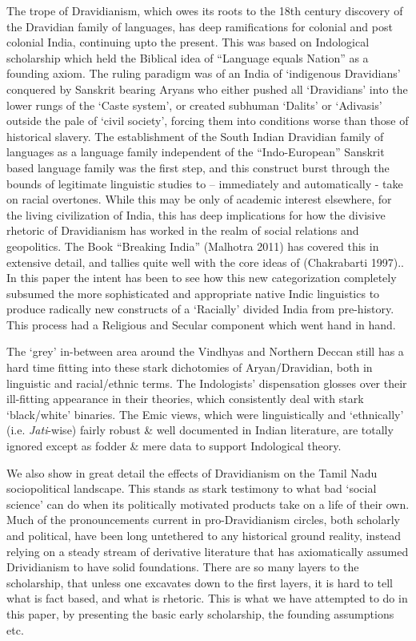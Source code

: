 The trope of Dravidianism, which owes its roots to the 18th century discovery of the Dravidian family of languages, has deep ramifications for colonial and post colonial India, continuing upto the present. This was based on Indological scholarship which held the Biblical idea of “Language equals Nation” as a founding axiom. The ruling paradigm was of an India of ‘indigenous Dravidians’ conquered by Sanskrit bearing Aryans who either pushed all ‘Dravidians’ into the lower rungs of the ‘Caste system’, or created subhuman ‘Dalits’ or ‘Adivasis’ outside the pale of ‘civil society’, forcing them into conditions worse than those of historical slavery. The establishment of the South Indian Dravidian family of languages as a language family independent of the “Indo-European” Sanskrit based language family was the first step, and this construct burst through the bounds of legitimate linguistic studies to – immediately and automatically - take on racial overtones. While this may be only of academic interest elsewhere, for the living civilization of India, this has deep implications for how the divisive rhetoric of Dravidianism has worked in the realm of social relations and geopolitics. The Book “Breaking India” (Malhotra 2011) has covered this in extensive detail, and tallies quite well with the core ideas of (Chakrabarti 1997).. In this paper the intent has been to see how this new categorization completely subsumed the more sophisticated and appropriate native Indic linguistics to produce radically new constructs of a ‘Racially’ divided India from pre-history. This process had a Religious and Secular component which went hand in hand.

The ‘grey’ in-between area around the Vindhyas and Northern Deccan still has a hard time fitting into these stark dichotomies of Aryan/Dravidian, both in linguistic and racial/ethnic terms. The Indologists’ dispensation glosses over their ill-fitting appearance in their theories, which consistently deal with stark ‘black/white’ binaries. The Emic views, which were linguistically and ‘ethnically’ (i.e. \textit{Jati}-wise) fairly robust \& well documented in Indian literature, are totally ignored except as fodder \& mere data to support Indological theory.

We also show in great detail the effects of Dravidianism on the Tamil Nadu sociopolitical landscape. This stands as stark testimony to what bad ‘social science’ can do when its politically motivated products take on a life of their own. Much of the pronouncements current in pro-Dravidianism circles, both scholarly and political, have been long untethered to any historical ground reality, instead relying on a steady stream of derivative literature that has axiomatically assumed Drividianism to have solid foundations. There are so many layers to the scholarship, that unless one excavates down to the first layers, it is hard to tell what is fact based, and what is rhetoric. This is what we have attempted to do in this paper, by presenting the basic early scholarship, the founding assumptions etc.

